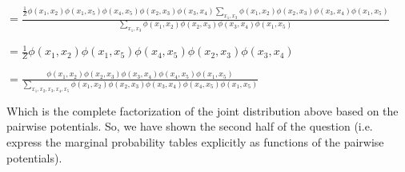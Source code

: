 \documentclass[12pt]{article}
\begin{document}
$= \frac{\frac{1}{Z}\phi(x_1, x_2)\phi(x_1, x_5)\phi(x_4, x_5)\phi(x_2, x_3)\phi(x_3, x_4)\sum_{x_1, x_3} \phi(x_1, x_2)\phi(x_2, x_3)\phi(x_3, x_4)\phi(x_1, x_5)}{\sum_{x_1, x_3} \phi(x_1, x_2)\phi(x_2, x_3)\phi(x_3, x_4)\phi(x_1, x_5)}$

$= \frac{1}{Z}\phi(x_1, x_2)\phi(x_1, x_5)\phi(x_4, x_5)\phi(x_2, x_3)\phi(x_3, x_4)$

$= \frac{\phi(x_1, x_2)\phi(x_2, x_3)\phi(x_3, x_4)\phi(x_4, x_5)\phi(x_1, x_5)}{\sum_{x_1, x_2, x_3, x_4, x_5} \phi(x_1, x_2)\phi(x_2, x_3)\phi(x_3, x_4)\phi(x_4, x_5)\phi(x_1, x_5)}$

Which is the complete factorization of the joint distribution above based on the pairwise potentials. So, we have shown the second half of the question (i.e. express the marginal probability tables explicitly as functions of the pairwise potentials).
\end{document}

